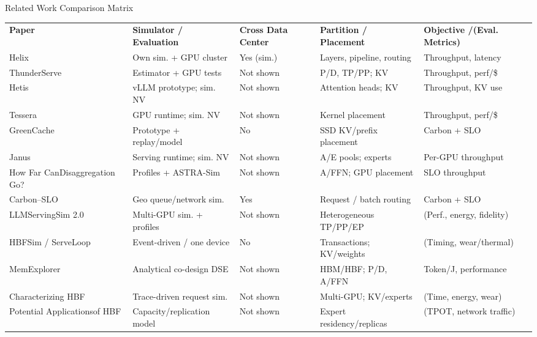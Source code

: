 \documentclass[aspectratio=169,10pt]{beamer}
\begin{document}
\begin{frame}[t]{Related Work Comparison Matrix}
\vspace{.02cm}
{\fontsize{7.5}{9.3}\selectfont
\setlength{\tabcolsep}{3pt}\renewcommand{\arraystretch}{1.30}
\begin{tabularx}{\textwidth}{@{}>{\raggedright\arraybackslash}p{2.65cm}>{\raggedright\arraybackslash}p{3.20cm}>{\raggedright\arraybackslash}p{1.50cm}>{\raggedright\arraybackslash}X >{\raggedright\arraybackslash}p{2.85cm}@{}}
\rowcolor{SoftMint}\textbf{Paper} & \textbf{Simulator / Evaluation} & \textbf{Cross Data Center} & \textbf{Partition / Placement} & \textbf{Objective /\newline (Eval. Metrics)}\\
Helix & Own sim. + GPU cluster & Yes (sim.) & Layers, pipeline, routing & Throughput, latency\\
\rowcolor{SoftLilac}ThunderServe & Estimator + GPU tests & Not shown & P/D, TP/PP; KV & Throughput, perf/\$\\
Hetis & vLLM prototype; sim. NV & Not shown & Attention heads; KV & Throughput, KV use\\
\rowcolor{SoftLilac}Tessera & GPU runtime; sim. NV & Not shown & Kernel placement & Throughput, perf/\$\\
GreenCache & Prototype + replay/model & No & SSD KV/prefix placement & Carbon + SLO\\
\rowcolor{SoftLilac}Janus & Serving runtime; sim. NV & Not shown & A/E pools; experts & Per-GPU throughput\\
How Far Can\newline Disaggregation Go? & Profiles + ASTRA-Sim & Not shown & A/FFN; GPU placement & SLO throughput\\
\rowcolor{SoftLilac}Carbon--SLO & Geo queue/network sim. & Yes & Request / batch routing & Carbon + SLO\\
LLMServingSim 2.0 & Multi-GPU sim. + profiles & Not shown & Heterogeneous TP/PP/EP & (Perf., energy, fidelity)\\
\rowcolor{SoftLilac}HBFSim / ServeLoop & Event-driven / one device & No & Transactions; KV/weights & (Timing, wear/thermal)\\
MemExplorer & Analytical co-design DSE & Not shown & HBM/HBF; P/D, A/FFN & Token/J, performance\\
\rowcolor{SoftLilac}Characterizing HBF & Trace-driven request sim. & Not shown & Multi-GPU; KV/experts & (Time, energy, wear)\\
Potential Applications\newline of HBF & Capacity/replication model & Not shown & Expert residency/replicas & (TPOT, network traffic)\\
\end{tabularx}\par}
\end{frame}
\end{document}

